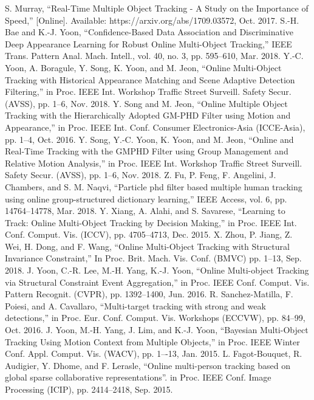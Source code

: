 \documentclass[journal]{IEEEtran}
\newcounter{ct}
\begin{document}
\begin{thebibliography}{00}
 S. Murray, ``Real-Time Multiple Object Tracking - A Study on the Importance of Speed,'' [Online]. Available: https://arxiv.org/abs/1709.03572, Oct. 2017.
S.-H. Bae and K.-J. Yoon, ``Confidence-Based Data Association and Discriminative Deep Appearance Learning for Robust Online Multi-Object Tracking,'' IEEE Trans. Pattern Anal. Mach. Intell., vol. 40, no. 3, pp. 595--610, Mar. 2018. 
Y.-C. Yoon, A. Boragule, Y. Song, K. Yoon, and M. Jeon, ``Online Multi-Object Tracking with Historical Appearance Matching and Scene Adaptive Detection Filtering,'' in Proc. IEEE Int. Workshop Traffic Street Surveill. Safety Secur. (AVSS), pp. 1--6, Nov. 2018.
 Y. Song and M. Jeon, ``Online Multiple Object Tracking with the Hierarchically Adopted GM-PHD Filter using Motion and Appearance,'' in Proc. IEEE Int. Conf. Consumer Electronics-Asia (ICCE-Asia), pp. 1--4, Oct. 2016.
 Y. Song, Y.-C. Yoon, K. Yoon, and M. Jeon, ``Online and Real-Time Tracking with the GMPHD Filter using Group Management and Relative Motion Analysis,'' in Proc. IEEE Int. Workshop Traffic Street Surveill. Safety Secur. (AVSS), pp. 1--6, Nov. 2018.
 Z. Fu, P. Feng, F. Angelini, J. Chambers, and S. M. Naqvi, ``Particle phd filter based multiple human tracking using online group-structured dictionary learning,'' IEEE Access, vol. 6, pp. 14764--14778, Mar. 2018.
Y. Xiang, A. Alahi, and S. Savarese, ``Learning to Track: Online Multi-Object Tracking by Decision Making,'' in Proc. IEEE Int. Conf. Comput. Vis. (ICCV), pp. 4705--4713, Dec. 2015.
X. Zhou, P. Jiang, Z. Wei, H. Dong, and F. Wang, ``Online Multi-Object Tracking with Structural Invariance Constraint,'' In Proc. Brit. Mach. Vis. Conf. (BMVC) pp.  1--13, Sep. 2018.
J. Yoon, C.-R. Lee, M.-H. Yang, K.-J. Yoon, ``Online Multi-object Tracking via Structural Constraint Event Aggregation,'' in Proc. IEEE Conf. Comput. Vis. Pattern Recognit. (CVPR), pp. 1392--1400, Jun. 2016.
R. Sanchez-Matilla, F. Poiesi, and A. Cavallaro, ``Multi-target tracking with strong and weak detections,'' in Proc. Eur. Conf. Comput. Vis. Workshops (ECCVW), pp. 84--99, Oct. 2016.
J. Yoon, M.-H. Yang, J. Lim, and K.-J. Yoon, ``Bayesian Multi-Object Tracking Using Motion Context from Multiple Objects,'' in Proc. IEEE Winter Conf. Appl. Comput. Vis. (WACV), pp. 1–-13, Jan. 2015.
L. Fagot-Bouquet, R. Audigier, Y. Dhome, and F. Lerasle, ``Online multi-person tracking based on global sparse collaborative representations''. in Proc. IEEE Conf. Image Processing (ICIP), pp. 2414--2418, Sep. 2015.

\end{thebibliography}
\end{document}
